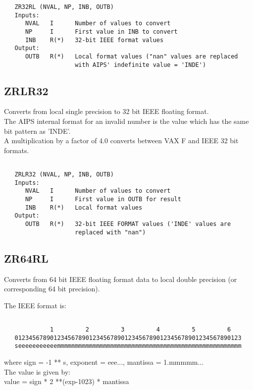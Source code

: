 \begin{verbatim}
   ZR32RL (NVAL, NP, INB, OUTB)
   Inputs:
      NVAL   I      Number of values to convert
      NP     I      First value in INB to convert
      INB    R(*)   32-bit IEEE format values
   Output:
      OUTB   R(*)   Local format values ("nan" values are replaced
                    with AIPS' indefinite value = 'INDE')

\end{verbatim}

\subsection{ZRLR32}
Converts from local single precision to 32 bit IEEE floating format.\\
The AIPS internal format for an invalid number is the value which
has the same bit pattern as 'INDE'.\\
A multiplication by a factor of 4.0 converts between VAX F and IEEE
32 bit formats.
\begin{verbatim}

   ZRLR32 (NVAL, NP, INB, OUTB)
   Inputs:
      NVAL   I      Number of values to convert
      NP     I      First value in OUTB for result
      INB    R(*)   Local format values
   Output:
      OUTB   R(*)   32-bit IEEE FORMAT values ('INDE' values are
                    replaced with "nan")

\end{verbatim}

\subsection{ZR64RL}
Converts from 64 bit IEEE floating format data to local double
precision (or corresponding 64 bit precision).

The IEEE format is:
\begin{verbatim}

             1         2         3         4         5         6
   0123456789012345678901234567890123456789012345678901234567890123
   seeeeeeeeeeemmmmmmmmmmmmmmmmmmmmmmmmmmmmmmmmmmmmmmmmmmmmmmmmmmmm

\end{verbatim}
where sign = -1 ** s, exponent = eee..., mantissa = 1.mmmmm...\\

The value is given by:\\

   value = sign * 2 **(exp-1023) * mantissa


